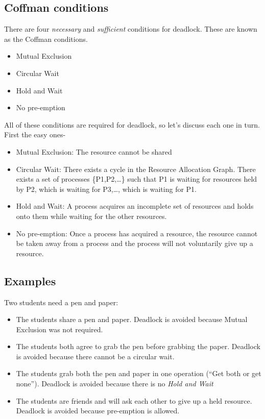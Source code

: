 \subsection{Coffman conditions}\label{coffman-conditions}

There are four \emph{necessary} and \emph{sufficient} conditions for
deadlock. These are known as the Coffman conditions.

\begin{itemize}
\itemsep1pt\parskip0pt
\item
  Mutual Exclusion
\item
  Circular Wait
\item
  Hold and Wait
\item
  No pre-emption
\end{itemize}

All of these conditions are required for deadlock, so let's discuss each
one in turn. First the easy ones-

\begin{itemize}
\itemsep1pt\parskip0pt
\item
  Mutual Exclusion: The resource cannot be shared
\item
  Circular Wait: There exists a cycle in the Resource Allocation Graph.
  There exists a set of processes \{P1,P2,\ldots{}\} such that P1 is
  waiting for resources held by P2, which is waiting for P3,\ldots{},
  which is waiting for P1.
\item
  Hold and Wait: A process acquires an incomplete set of resources and
  holds onto them while waiting for the other resources.
\item
  No pre-emption: Once a process has acquired a resource, the resource
  cannot be taken away from a process and the process will not
  voluntarily give up a resource.
\end{itemize}

\subsection{Examples}\label{examples}

Two students need a pen and paper:

\begin{itemize}
\itemsep1pt\parskip0pt
\item
  The students share a pen and paper. Deadlock is avoided because Mutual
  Exclusion was not required.
\item
  The students both agree to grab the pen before grabbing the paper.
  Deadlock is avoided because there cannot be a circular wait.
\item
  The students grab both the pen and paper in one operation (``Get both
  or get none''). Deadlock is avoided because there is no \emph{Hold and
  Wait}
\item
  The students are friends and will ask each other to give up a held
  resource. Deadlock is avoided because pre-emption is allowed.
\end{itemize}

